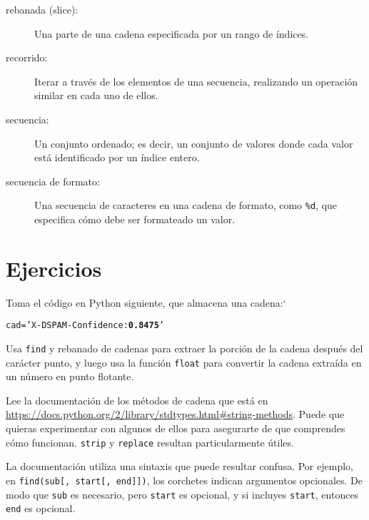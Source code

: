 \begin{description}
\item[rebanada (slice):] Una parte de una cadena especificada por un rango de índices.

\item[recorrido:] Iterar a través de los elementos de una secuencia,
realizando un operación similar en cada uno de ellos.

\item[secuencia:] Un conjunto ordenado; es decir, un conjunto de
valores donde cada valor está identificado por un índice entero.

\item[secuencia de formato:] Una secuencia de caracteres en una cadena de formato,
como {\tt \%d}, que especifica cómo debe ser formateado un valor.

\end{description}


\section{Ejercicios}

\begin{ex}
Toma el código en Python siguiente, que almacena una cadena:`

\beforeverb
\begin{alltt}
cad = 'X-DSPAM-Confidence: {\bf 0.8475}'
\end{alltt}
\afterverb

Usa {\tt find} y rebanado de cadenas para extraer la porción
de la cadena después del carácter punto, y luego usa la
función {\tt float} para convertir la cadena extraída en
un número en punto flotante.

\end{ex}


\begin{ex}

Lee la documentación de los métodos de cadena que está en
\url{https://docs.python.org/2/library/stdtypes.html#string-methods}.
Puede que quieras experimentar con algunos de ellos para asegurarte
de que comprendes cómo funcionan. {\tt strip} y
{\tt replace} resultan particularmente útiles.

La documentación utiliza una sintaxis que puede resultar confusa.
Por ejemplo, en \verb"find(sub[, start[, end]])", los corchetes
indican argumentos opcionales. De modo que {\tt sub} es necesario,
pero {\tt start} es opcional, y si incluyes {\tt start},
entonces {\tt end} es opcional.

\end{ex}